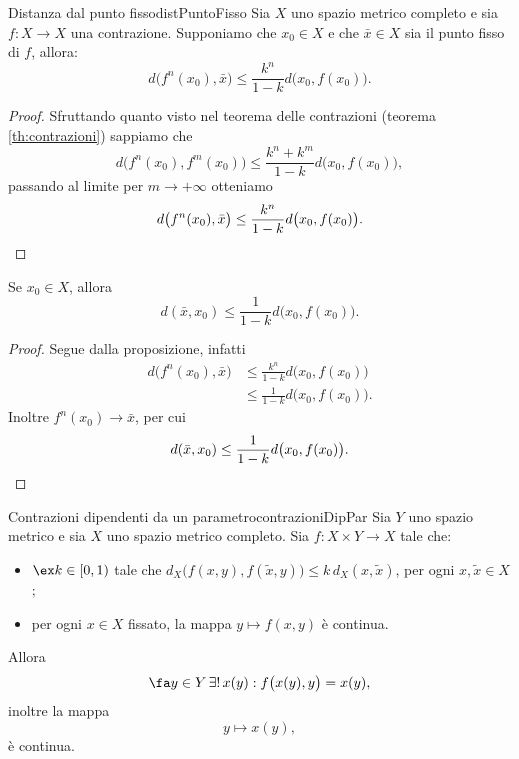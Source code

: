 \begin{prop}{Distanza dal punto fisso}{distPuntoFisso}
	Sia \(X\) uno spazio metrico completo e sia \(f\colon X\to X\) una contrazione.
	Supponiamo che \(x_0\in X\) e che \(\bar{x}\in X\) sia il punto fisso di \(f\), allora:
	\[
		d\big(f^n(x_0),\bar{x}\big)\le\frac{k^n}{1-k}d\big(x_0,f(x_0)\big).
	\]
\end{prop}

\begin{proof}
	Sfruttando quanto visto nel teorema delle contrazioni (teorema \ref{th:contrazioni}) sappiamo che
	\[
		d\big(f^n(x_0),f^m(x_0)\big)\le\frac{k^n+k^m}{1-k}d\big(x_0,f(x_0)\big),
	\]
	passando al limite per \(m\to+\infty\) otteniamo
	\[
		d\big(f^n(x_0),\bar{x}\big)\le\frac{k^n}{1-k}d\big(x_0,f(x_0)\big).\qedhere
	\]
\end{proof}

\begin{cor}
	Se \(x_0\in X\), allora
	\[
		d(\bar{x},x_0)\le\frac{1}{1-k}d\big(x_0,f(x_0)\big).
	\]
\end{cor}

\begin{proof}
	Segue dalla proposizione, infatti
	\[
		\begin{split}
			d\big(f^n(x_0),\bar{x}\big) & \le\frac{k^n}{1-k}d\big(x_0,f(x_0)\big)\\
			& \le\frac{1}{1-k}d\big(x_0,f(x_0)\big).
		\end{split}
	\]
	Inoltre \(f^n(x_0)\to\bar{x}\), per cui
	\[
		d(\bar{x},x_0)\le\frac{1}{1-k}d\big(x_0,f(x_0)\big).\qedhere
	\]
\end{proof}

\begin{teor}{Contrazioni dipendenti da un parametro}{contrazioniDipPar}
	Sia \(Y\) uno spazio metrico e sia \(X\) uno spazio metrico completo.
	Sia \(f\colon X\times Y\to X\) tale che:
	\begin{itemize}
		\item \(\ex k\in[0,1)\) tale che \(d_X\big(f(x,y),f(\tilde{x},y)\big)\le k\,d_X(x,\tilde{x})\), per ogni \(x,\tilde{x}\in X\);
		\item per ogni \(x\in X\) fissato, la mappa \(y\mapsto f(x,y)\) è continua.
	\end{itemize}
	Allora
	\[
		\fa y\in Y\,\exists!\,x(y):f\big(x(y),y\big)=x(y),
	\]
	inoltre la mappa
	\[
		y\mapsto x(y),
	\]
	è continua.
\end{teor}

